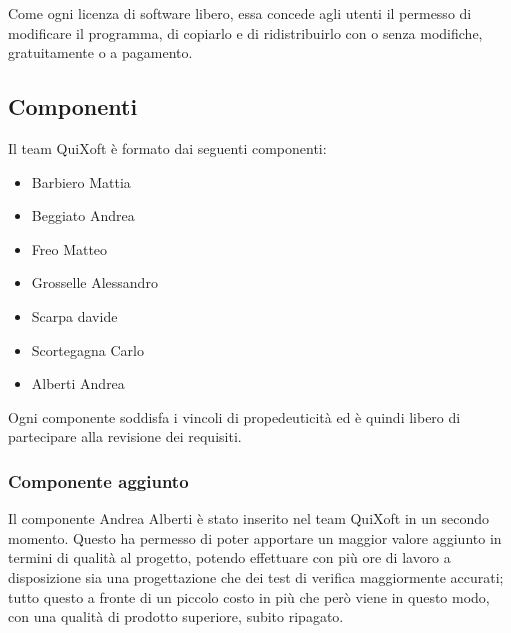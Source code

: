 \documentclass[11pt,a4paper]{article}
\begin{document}
Come ogni licenza di software libero, essa concede agli utenti il permes\-so di modificare il programma, di copiarlo e di ridistribuirlo con o senza modifiche, gratuitamente o a pagamento.
\subsection{Componenti}
Il team QuiXoft è formato dai seguenti componenti:
\begin{itemize}
\item Barbiero Mattia
\item Beggiato Andrea
\item Freo Matteo
\item Grosselle Alessandro
\item Scarpa davide
\item Scortegagna Carlo
\item Alberti Andrea
\end{itemize}
Ogni componente soddisfa i vincoli di propedeuticità ed è quindi libero di partecipare alla revisione dei requisiti.
\subsubsection{Componente aggiunto}
Il componente Andrea Alberti è stato inserito nel team QuiXoft in un secondo momento. Questo ha permesso di poter apportare un maggior valore aggiunto in termini di qualità al progetto, potendo effettuare con più ore di lavoro a disposizione sia una progettazione che dei test di verifica maggiormente accurati; tutto questo a fronte di un piccolo costo in più che però viene in questo modo, con una qualità di prodotto superiore, subito ripagato.
\end{document}
